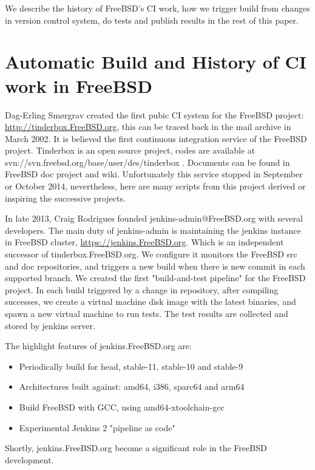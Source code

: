 \documentclass[a4paper,twocolumn,10pt]{article}
\begin{document}
We describe the history of FreeBSD's CI work, how we trigger build from changes
in version control system, do tests and publish results in the rest of this
paper.

\section{Automatic Build and History of CI work in FreeBSD}

Dag-Erling Smørgrav created the first pubic CI system for the FreeBSD project:
\url{http://tinderbox.FreeBSD.org}, this can be traced back in the mail archive in
March 2002. It is believed the first continuous integration service of the
FreeBSD project. Tinderbox is an open source project, codes are available at
svn://svn.freebsd.org/base/user/des/tinderbox .  Documents can be found in
FreeBSD doc project and wiki. Unfortunately this service stopped in September
or October 2014, nevertheless, here are many scripts from this project derived
or inspiring the successive projects.

In late 2013, Craig Rodrigues founded jenkins-admin@FreeBSD.org with several
developers. The main duty of jenkins-admin is maintaining the jenkins
instance in FreeBSD cluster, \url{https://jenkins.FreeBSD.org}. Which is an
independent successor of tinderbox.FreeBSD.org. We configure it monitors the
FreeBSD src and doc repositories, and triggers a new build when there is new
commit in each supported branch. We created the first "build-and-test pipeline"
for the FreeBSD project. In each build triggered by a change in repository,
after compiling successes, we create a virtual machine disk image with the
latest binaries, and spawn a new virtual machine to run tests. The test results
are collected and stored by jenkins server.

The highlight features of jenkins.FreeBSD.org are:

\begin{itemize}
\item Periodically build for head, stable-11, stable-10 and stable-9
\item Architectures built against: amd64, i386, sparc64 and arm64
\item Build FreeBSD with GCC, using amd64-xtoolchain-gcc
\item Experimental Jenkins 2 "pipeline as code"
\end{itemize}

Shortly, jenkins.FreeBSD.org become a significant role in the FreeBSD
development.
\end{document}
